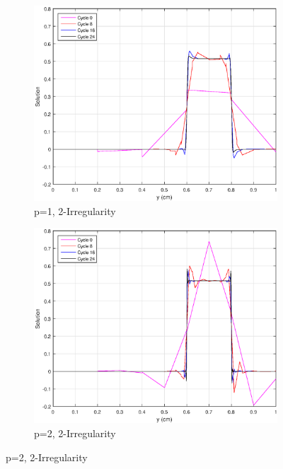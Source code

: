 \begin{figure}
{}
\vspace{2.5mm}
{
	\begin{subfigure}[b]{0.45\textwidth}
		\centering
		\label{subfig::SL_uniform_ef_me1_irr2}
		\includegraphics[width=\textwidth]{figures/sec_BF/SL_AMR_ME_k1_Irr2.eps}
		\caption{p=1, 2-Irregularity}
	\end{subfigure}
	\hfill
	\begin{subfigure}[b]{0.45\textwidth}
		\centering
		\label{subfig::SL_uniform_ef_me2_irr2}
		\includegraphics[width=\textwidth]{figures/sec_BF/SL_AMR_ME_k2_Irr2.eps}
		\caption{p=2, 2-Irregularity}
	\end{subfigure}
}
\end{figure}
